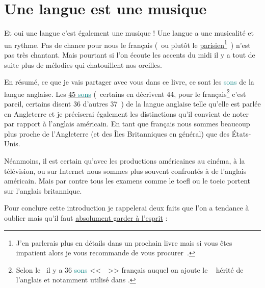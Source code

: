 \newpage

\section{Une langue est une musique}\label{sec:music}
Et oui une langue c'est également une musique ! Une langue a une
musicalité et un rythme. Pas de chance pour nous le français (~ou
plutôt le \underline{parisien}\footnote{J'en parlerais plus en détails
  dans un prochain livre mais si vous êtes impatient alors je vous
  recommande de vous procurer~\cite{brunel}.}~)
n'est pas très chantant. Mais pourtant si l'on écoute les accents du
midi il y a tout de suite plus de mélodies qui chatouillent nos
oreilles. 

En résumé, ce que je vais partager avec vous dans ce livre, ce
sont les \textcolor{teal}{sons} de la langue anglaise. Les \href{https://pronunciationstudio.com/45-Sounds/}{45 \textcolor{teal}{sons}} (~certains en
décrivent 44, pour le français\footnote{Selon le~\cite{ge} il y a 36 \textcolor{teal}{sons}
  <<~~>> français auquel on ajoute le \son~
  hérité de l'anglais et notamment utilisé dans .} c'est
pareil, certains disent 36 d'autres 37~) de la langue anglaise telle
qu'elle est parlée en Angleterre et je préciserai également les
distinctions qu'il convient de noter par rapport à l'anglais
américain. En tant que français nous sommes beaucoup plus proche de
l'Angleterre (et des Îles Britanniques en général) que des
\'Etats-Unis.

Néanmoins, il est certain qu'avec les productions américaines au
cinéma, à la télévision, ou sur Internet nous sommes plus souvent
confrontés à de l'anglais américain. Mais par contre tous les examens
comme le \acrfull{toefl} ou le \acrfull{toeic} portent sur l'anglais britannique. 

Pour conclure cette introduction je rappelerai deux faits que l'on a tendance à oublier mais qu'il faut \underline{absolument garder à l'esprit} :

